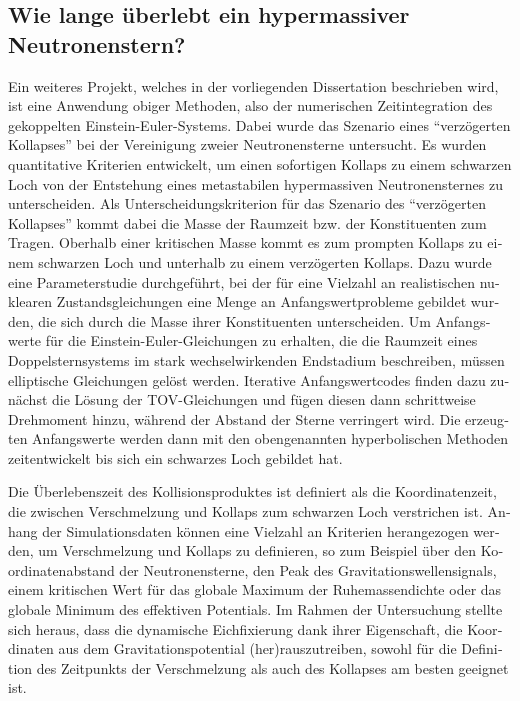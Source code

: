 \begin{otherlanguage}{german}
\begin{fullwidth}
\begin{center}
\begin{adjustwidth}{1cm}{1cm}
\subsection*{Wie lange überlebt ein hypermassiver Neutronenstern?}
Ein weiteres Projekt, welches in der vorliegenden Dissertation beschrieben wird,
ist eine Anwendung obiger Methoden, also der numerischen Zeitintegration des
gekoppelten Einstein-Euler-Systems. Dabei wurde das Szenario eines
``verzögerten Kollapses'' bei der Vereinigung zweier Neutronensterne untersucht.
Es wurden quantitative Kriterien entwickelt, um einen sofortigen Kollaps
zu einem schwarzen Loch von der Entstehung eines metastabilen hypermassiven
Neutronensternes zu unterscheiden.
Als Unterscheidungskriterion für das Szenario des ``verzögerten Kollapses''
kommt dabei die Masse der Raumzeit bzw. der Konstituenten zum Tragen. Oberhalb
einer kritischen Masse kommt es zum prompten Kollaps zu einem schwarzen Loch
und unterhalb zu einem verzögerten Kollaps.
Dazu wurde eine Parameterstudie
durchgeführt, bei der für eine Vielzahl an realistischen nuklearen
Zustandsgleichungen eine Menge an Anfangswertprobleme gebildet wurden, die sich
durch die Masse ihrer Konstituenten unterscheiden. Um Anfangswerte für die
Einstein-Euler-Gleichungen zu erhalten, die die Raumzeit eines
Doppelsternsystems im stark wechselwirkenden Endstadium beschreiben, müssen
elliptische Gleichungen gelöst werden. Iterative Anfangswertcodes finden
dazu zunächst die Lösung der TOV-Gleichungen und fügen diesen dann
schrittweise Drehmoment hinzu, während der Abstand der Sterne verringert wird.
Die erzeugten Anfangswerte werden dann mit den obengenannten hyperbolischen
Methoden zeitentwickelt bis sich ein schwarzes Loch gebildet hat.

Die Überlebenszeit des Kollisionsproduktes ist definiert als die
Koordinatenzeit, die zwischen Verschmelzung und Kollaps zum schwarzen Loch
verstrichen ist. Anhang der Simulationsdaten können eine Vielzahl an Kriterien
herangezogen werden, um Verschmelzung und Kollaps zu definieren, so zum
Beispiel über den Koordinatenabstand der Neutronensterne, den Peak des
Gravitationswellensignals, einem kritischen Wert für das globale Maximum der
Ruhemassendichte oder das globale Minimum des effektiven Potentials.
Im Rahmen der Untersuchung stellte sich heraus, dass die
dynamische Eichfixierung dank ihrer Eigenschaft, die Koordinaten aus dem
Gravitationspotential (her)rauszutreiben, sowohl für die Definition des
Zeitpunkts der Verschmelzung als auch des Kollapses am besten geeignet ist.


\end{adjustwidth}
\end{center}
\end{fullwidth}
\end{otherlanguage}
